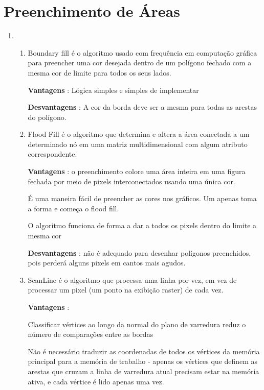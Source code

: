 \section*{Preenchimento de Áreas}

  \begin{enumerate}[label=\arabic*)] \addtocounter{enumi}{34}
   
   		\item 
   		
        \begin{enumerate}[label=\alph*.]
		\setlength\itemsep{1em}
		
		\item Boundary fill é o algoritmo usado com frequência em computação gráfica para preencher uma cor desejada dentro de um polígono fechado com a mesma cor de limite para todos os seus lados.
		
		\textbf{Vantagens} : Lógica simples e simples de implementar
		
		\textbf{Desvantagens} : A cor da borda deve ser a mesma para todas as arestas do polígono.
		
		\item Flood Fill é o algoritmo que determina e altera a área conectada a um determinado nó em uma matriz multidimensional com algum atributo correspondente.
	
		\textbf{Vantagens} : o preenchimento colore uma área inteira em uma figura fechada por meio de pixels interconectados usando uma única cor.
		
       É uma maneira fácil de preencher as cores nos gráficos. Um apenas toma a forma e começa o flood fill.
       
       O algoritmo funciona de forma a dar a todos os pixels dentro do limite a mesma cor
		
		\textbf{Desvantagens} : não é adequado para desenhar polígonos preenchidos, pois perderá alguns pixels em cantos mais agudos.
		
		\item ScanLine é o algoritmo que processa uma linha por vez, em vez de processar um pixel (um ponto na exibição raster) de cada vez.
		
		\textbf{Vantagens} : 
		
		Classificar vértices ao longo da normal do plano de varredura reduz o número de comparações entre as bordas
		
       Não é necessário traduzir as coordenadas de todos os vértices da memória principal para a memória de trabalho - apenas os vértices que definem as arestas que cruzam a linha de varredura atual precisam estar na memória ativa, e cada vértice é lido apenas uma vez.
       

\end{enumerate}
\end{enumerate}
